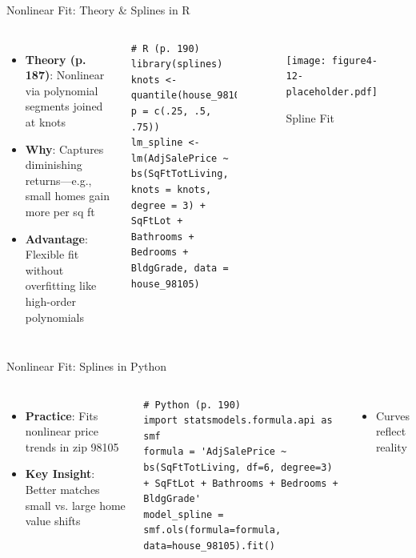 \documentclass{beamer}
\begin{document}
	\begin{frame}[fragile]{Nonlinear Fit: Theory \& Splines in R}
		\begin{columns}
			\begin{itemize}
				\item \textbf{Theory (p. 187)}: Nonlinear via polynomial segments joined at knots
				\item \textbf{Why}: Captures diminishing returns—e.g., small homes gain more per sq ft
				\item \textbf{Advantage}: Flexible fit without overfitting like high-order polynomials
			\end{itemize}
			\begin{lstlisting}
# R (p. 190)
library(splines)
knots <- quantile(house_98105$SqFtTotLiving, p = c(.25, .5, .75))
lm_spline <- lm(AdjSalePrice ~ bs(SqFtTotLiving, knots = knots, degree = 3) +
SqFtLot + Bathrooms + Bedrooms + BldgGrade, data = house_98105)
			\end{lstlisting}
			\begin{figure}
				\texttt{[image: figure4-12-placeholder.pdf]}
				\caption{Spline Fit}
			\end{figure}
		\end{columns}
	\end{frame}
	
	\begin{frame}[fragile]{Nonlinear Fit: Splines in Python}
		\lstset{language=Python}
		\begin{columns}
			\column{0.6\textwidth}
			\begin{itemize}
				\item \textbf{Practice}: Fits nonlinear price trends in zip 98105
				\item \textbf{Key Insight}: Better matches small vs. large home value shifts
			\end{itemize}
			\begin{lstlisting}
# Python (p. 190)
import statsmodels.formula.api as smf
formula = 'AdjSalePrice ~ bs(SqFtTotLiving, df=6, degree=3) + SqFtLot + Bathrooms + Bedrooms + BldgGrade'
model_spline = smf.ols(formula=formula, data=house_98105).fit()
			\end{lstlisting}
			\column{0.4\textwidth}
			\begin{itemize}
				\item Curves reflect reality
			\end{itemize}
		\end{columns}
	\end{frame}
	
\end{document}
